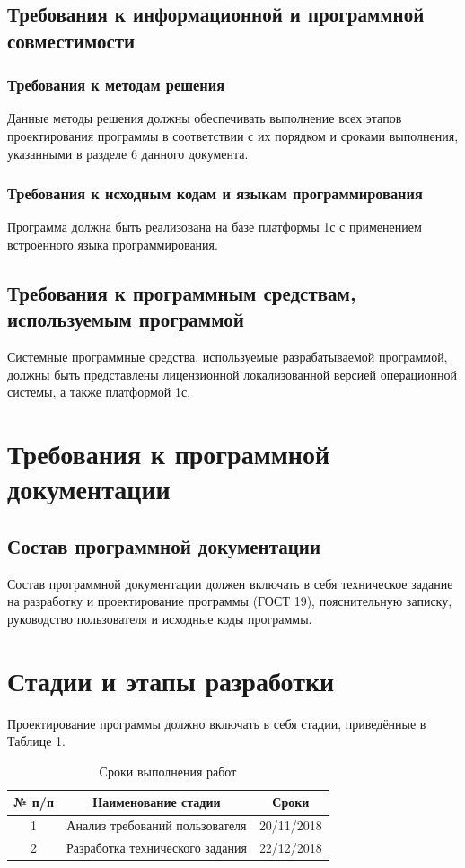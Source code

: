 \documentclass[14pt, a4paper]{extarticle}
\begin{document}
	\subsection{Требования к информационной и программной совместимости}
	\subsubsection{Требования к методам решения}
	
	Данные методы решения должны обеспечивать выполнение всех этапов проектирования программы в соответствии с их порядком и сроками выполнения, указанными в разделе 6 данного документа.
	\subsubsection{Требования к исходным кодам и языкам программирования}
	Программа должна быть реализована на базе платформы 1с с применением встроенного языка программирования.
	
	\subsection{Требования к программным средствам, используемым программой}
	Системные программные средства, используемые разрабатываемой программой, должны быть представлены лицензионной локализованной версией операционной системы, а также платформой 1с.
	
	\section{Требования к программной документации}
	\subsection{Состав программной документации}
	Состав программной документации должен включать в себя техническое задание на разработку и проектирование программы (ГОСТ 19), пояснительную записку, руководство пользователя и исходные коды программы.
	
	\section{Стадии и этапы разработки}
	Проектирование программы должно включать в себя стадии, приведённые в Таблице 1.\\
	\begin{table}[h!]
		\caption{Сроки выполнения работ}
		\begin{center}
			\label{tab:table1}
			\begin{tabular}{|c|c|c|}
				\hline
				№ п/п & Наименование стадии             & Сроки         \\
				\hline
				1     & Анализ требований пользователя  & 20/11/2018     \\
				\hline
				2     & Разработка технического задания & 22/12/2018     \\
				\hline
			\end{tabular}
		\end{center}
	\end{table}
	
\end{document}
